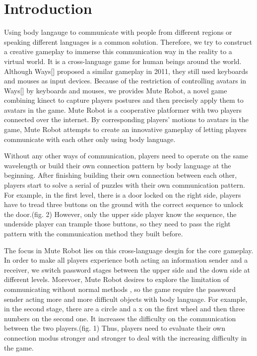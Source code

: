 \documentclass{chi-ext}
\begin{document}
\section{Introduction}
Using body langauge to communicate with people from different regions or speaking different languages is a common solution. 
Therefore, we try to construct a creative gameplay to immerse this communication way in the reality to a virtual world.
It is a cross-language game for human beings around the world. 
Although Ways[] proposed a similar gameplay in 2011, they still used keyboards and mouses as input devices.
Because of the restriction of controlling avatars in Ways[] by keyboards and mouses, we provides Mute Robot, a novel game combining kinect to capture players postures and then precisely apply them to avatars in the game.
Mute Robot is a cooperative platformer with two players connected over the internet.
By corresponding players' motions to avatars in the game, Mute Robot attempts to create an innovative gameplay of letting players communicate with each other only using body language.


Without any other ways of communication, players need to operate on the same wavelength or build their own connection pattern by body language at the beginning.
After finishing building their own connection between each other, players start to solve a serial of puzzles with their own communication pattern.
For example, in the first level, there is a door locked on the right side, players have to tread three buttons on the ground with the correct sequence to unlock the door.(fig. 2)
However, only the upper side player know the sequence, the underside player can trample those buttons, so they need to pass the right pattern with the communication method they built before.

The focus in Mute Robot lies on this cross-language desgin for the core gameplay.
In order to make all players experience both acting an information sender and a receiver, we switch password stages between the upper side and the down side at different levels.
Morevoer, Mute Robot desires to explore the limitation of communicating without normal methods , so the game require the password sender acting more and more difficult objects with body language.
For example, in the second stage, there are a circle and a x on the first wheel and then three numbers on the second one. It increases the difficulty on the communication between the two players.(fig. 1)
Thus, players need to evaluate their own connection modus stronger and stronger to deal with the increasing difficulty in the game. 
\end{document}
